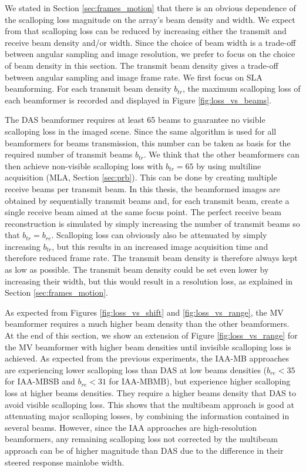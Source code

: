 We stated in Section \ref{sec:frames_motion} that there is an obvious dependence of the scalloping loss magnitude on the array's beam density and width.
We expect from \cite{Asen_shift_invariance} that scalloping loss can be reduced by increasing either the transmit and receive beam density and/or width.
Since the choice of beam width is a trade-off between angular sampling and image resolution, we prefer to focus on the choice of beam density in this section.
The transmit beam density gives a trade-off between angular sampling and image frame rate. We first focus on SLA beamforming.
For each transmit beam density $b_{tr}$, the maximum scalloping loss of each beamformer is recorded and displayed in Figure \ref{fig:loss_vs_beams}.

The DAS beamformer requires at least 65 beams to guarantee no visible scalloping loss in the imaged scene. Since the same algorithm is used for all beamformers for beams transmission, this number can be taken as basis for the required number of transmit beams $b_{tr}$. We think that the other beamformers can then achieve non-visible scalloping loss with $b_{tr} = 65$ by using multiline acquisition (MLA, Section \ref{sec:prb}). This can be done by creating multiple receive beams per transmit beam.
In this thesis, the beamformed images are obtained by sequentially transmit beams and, for each transmit beam, create a single receive beam aimed at the same focus point.
The perfect receive beam reconstruction is simulated by simply increasing the number of transmit beams so that $b_{tr} = b_{re}$.
Scalloping loss can obviously also be attenuated by simply increasing $b_{tr}$, but this results in an increased image acquisition time and therefore reduced frame rate. The transmit beam density is therefore always kept as low as possible.
The transmit beam density could be set even lower by increasing their width, but this would result in a resolution loss, as explained in Section \ref{sec:frames_motion}. 

As expected from Figures \ref{fig:loss_vs_shift} and \ref{fig:loss_vs_range}, the MV beamformer requires a much higher beam density than the other beamformers.
At the end of this section, we show an extension of Figure \ref{fig:loss_vs_range} for the MV beamformer with higher beam densities until invisible scalloping loss is achieved.
As expected from the previous experiments, the IAA-MB approaches are experiencing lower scalloping loss than DAS at low beams densities ($b_{re} < 35$ for IAA-MBSB and $b_{re} < 31$ for IAA-MBMB), but experience higher scalloping loss at higher beams densities. They require a higher beams density that DAS to avoid visible scalloping loss. This shows that the multibeam approach is good at attenuating major scalloping losses, by combining the information contained in several beams. However, since the IAA approaches are high-resolution beamformers, any remaining scalloping loss not corrected by the multibeam approach can be of higher magnitude than DAS due to the difference in their steered response mainlobe width.


